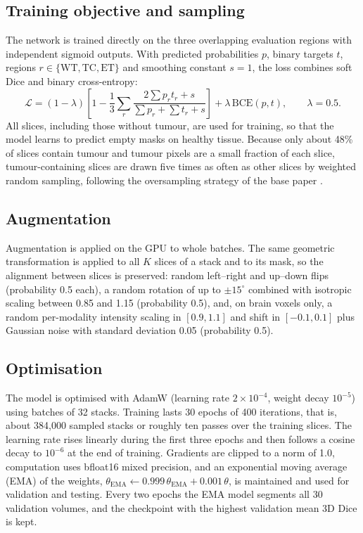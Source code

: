 \subsection{Training objective and sampling}
The network is trained directly on the three overlapping evaluation regions with independent sigmoid outputs. With predicted probabilities $p$, binary targets $t$, regions $r \in \{\mathrm{WT}, \mathrm{TC}, \mathrm{ET}\}$ and smoothing constant $s=1$, the loss combines soft Dice and binary cross-entropy:
\begin{equation}
\mathcal{L} = (1-\lambda)\left[1 - \frac{1}{3}\sum_{r}\frac{2\sum p_r t_r + s}{\sum p_r + \sum t_r + s}\right] + \lambda\,\mathrm{BCE}(p,t), \qquad \lambda = 0.5 .
\end{equation}
All slices, including those without tumour, are used for training, so that the model learns to predict empty masks on healthy tissue. Because only about 48\% of slices contain tumour and tumour pixels are a small fraction of each slice, tumour-containing slices are drawn five times as often as other slices by weighted random sampling, following the oversampling strategy of the base paper \cite{abdikenov2026}.

\subsection{Augmentation}
Augmentation is applied on the GPU to whole batches. The same geometric transformation is applied to all $K$ slices of a stack and to its mask, so the alignment between slices is preserved: random left--right and up--down flips (probability 0.5 each), a random rotation of up to $\pm 15^{\circ}$ combined with isotropic scaling between 0.85 and 1.15 (probability 0.5), and, on brain voxels only, a random per-modality intensity scaling in $[0.9, 1.1]$ and shift in $[-0.1, 0.1]$ plus Gaussian noise with standard deviation 0.05 (probability 0.5).

\subsection{Optimisation}
The model is optimised with AdamW \cite{loshchilov2019} (learning rate $2 \times 10^{-4}$, weight decay $10^{-5}$) using batches of 32 stacks. Training lasts 30 epochs of 400 iterations, that is, about 384,000 sampled stacks or roughly ten passes over the training slices. The learning rate rises linearly during the first three epochs and then follows a cosine decay to $10^{-6}$ at the end of training. Gradients are clipped to a norm of 1.0, computation uses bfloat16 mixed precision, and an exponential moving average (EMA) of the weights, $\theta_{\mathrm{EMA}} \leftarrow 0.999\,\theta_{\mathrm{EMA}} + 0.001\,\theta$, is maintained and used for validation and testing. Every two epochs the EMA model segments all 30 validation volumes, and the checkpoint with the highest validation mean 3D Dice is kept.

